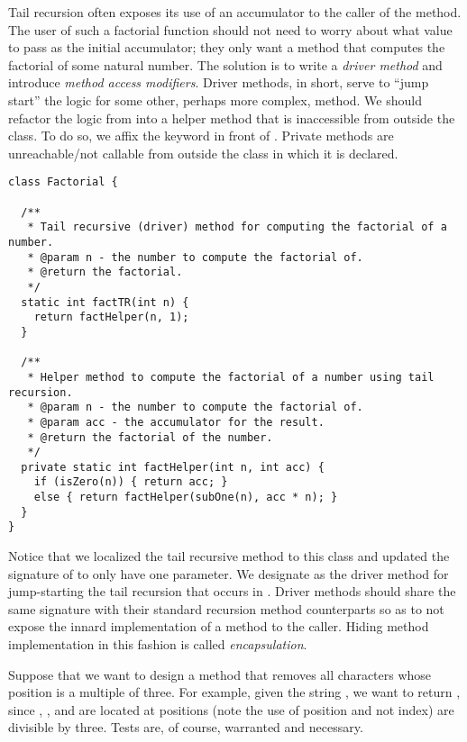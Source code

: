 Tail recursion often exposes its use of an accumulator to the caller of the method. 
The user of such a factorial function should not need to worry about what value to pass as the initial accumulator; they only want a method that computes the factorial of some natural number. 
The solution is to write a \emph{driver method} and introduce \emph{method access modifiers}. 
Driver methods, in short, serve to ``jump start'' the logic for some other, perhaps more complex, method. 
We should refactor the logic from  into a helper method that is inaccessible from outside the class. 
To do so, we affix the  keyword in front of . 
Private methods are unreachable/not callable from outside the class in which it is declared.

\begin{lstlisting}[language=MyJava]
class Factorial {
  
  /**
   * Tail recursive (driver) method for computing the factorial of a number.
   * @param n - the number to compute the factorial of.
   * @return the factorial.
   */
  static int factTR(int n) {
    return factHelper(n, 1);
  }

  /**
   * Helper method to compute the factorial of a number using tail recursion.
   * @param n - the number to compute the factorial of.
   * @param acc - the accumulator for the result.
   * @return the factorial of the number.
   */
  private static int factHelper(int n, int acc) {
    if (isZero(n)) { return acc; } 
    else { return factHelper(subOne(n), acc * n); }
  }
}
\end{lstlisting}

Notice that we localized the tail recursive method to this class and updated the signature of  to only have one parameter. 
We designate  as the driver method for jump-starting the tail recursion that occurs in . 
Driver methods should share the same signature with their standard recursion method counterparts so as to not expose the innard implementation of a method to the caller. 
Hiding method implementation in this fashion is called \emph{encapsulation}. 

Suppose that we want to design a method that removes all characters whose position is a multiple of three. 
For example, given the string , we want to return , since , , and  are located at positions (note the use of position and not index) are divisible by three. 
Tests are, of course, warranted and necessary.


